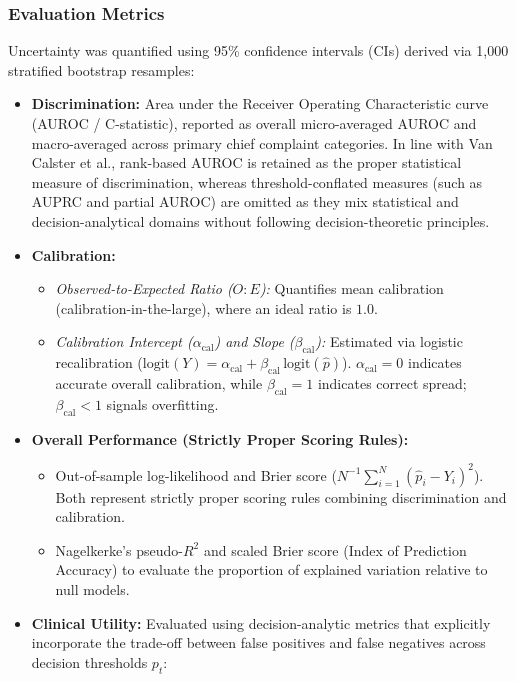 \subsubsection{Evaluation Metrics}
Uncertainty was quantified using 95\% confidence intervals (CIs) derived via 1,000 stratified bootstrap resamples:
\begin{itemize}
    \item \textbf{Discrimination:} Area under the Receiver Operating Characteristic curve (AUROC / C-statistic), reported as overall micro-averaged AUROC and macro-averaged across primary chief complaint categories. In line with Van Calster et al., rank-based AUROC is retained as the proper statistical measure of discrimination, whereas threshold-conflated measures (such as AUPRC and partial AUROC) are omitted as they mix statistical and decision-analytical domains without following decision-theoretic principles.
    \item \textbf{Calibration:}
    \begin{itemize}
        \item \textit{Observed-to-Expected Ratio ($O:E$):} Quantifies mean calibration (calibration-in-the-large), where an ideal ratio is $1.0$.
        \item \textit{Calibration Intercept ($\alpha_{\text{cal}}$) and Slope ($\beta_{\text{cal}}$):} Estimated via logistic recalibration ($\text{logit}(Y) = \alpha_{\text{cal}} + \beta_{\text{cal}}\,\text{logit}(\hat{p})$). $\alpha_{\text{cal}} = 0$ indicates accurate overall calibration, while $\beta_{\text{cal}} = 1$ indicates correct spread; $\beta_{\text{cal}} < 1$ signals overfitting.
    \end{itemize}
    \item \textbf{Overall Performance (Strictly Proper Scoring Rules):}
    \begin{itemize}
        \item Out-of-sample log-likelihood and Brier score ($N^{-1}\sum_{i=1}^N (\hat{p}_i - Y_i)^2$). Both represent strictly proper scoring rules combining discrimination and calibration.
        \item Nagelkerke's pseudo-$R^2$ and scaled Brier score (Index of Prediction Accuracy) to evaluate the proportion of explained variation relative to null models.
    \end{itemize}
    \item \textbf{Clinical Utility:} Evaluated using decision-analytic metrics that explicitly incorporate the trade-off between false positives and false negatives across decision thresholds $p_t$:

\end{itemize}
